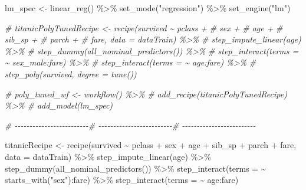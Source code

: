 \documentclass[
]{article}
\newenvironment{Shaded}{\begin{snugshade}}{\end{snugshade}}
\newcommand{\AttributeTok}[1]{\textcolor[rgb]{0.77,0.63,0.00}{#1}}
\newcommand{\CommentTok}[1]{\textcolor[rgb]{0.56,0.35,0.01}{\textit{#1}}}
\newcommand{\FunctionTok}[1]{\textcolor[rgb]{0.00,0.00,0.00}{#1}}
\newcommand{\NormalTok}[1]{#1}
\newcommand{\OtherTok}[1]{\textcolor[rgb]{0.56,0.35,0.01}{#1}}
\newcommand{\SpecialCharTok}[1]{\textcolor[rgb]{0.00,0.00,0.00}{#1}}
\newcommand{\StringTok}[1]{\textcolor[rgb]{0.31,0.60,0.02}{#1}}
\begin{document}
\begin{Shaded}
\begin{Highlighting}[]
\NormalTok{lm\_spec }\OtherTok{\textless{}{-}} \FunctionTok{linear\_reg}\NormalTok{() }\SpecialCharTok{\%\textgreater{}\%}
  \FunctionTok{set\_mode}\NormalTok{(}\StringTok{"regression"}\NormalTok{) }\SpecialCharTok{\%\textgreater{}\%}
  \FunctionTok{set\_engine}\NormalTok{(}\StringTok{"lm"}\NormalTok{)}


\CommentTok{\# titanicPolyTunedRecipe \textless{}{-} recipe(survived \textasciitilde{} pclass +}
\CommentTok{\#                            sex +}
\CommentTok{\#                            age +}
\CommentTok{\#                            sib\_sp +}
\CommentTok{\#                            parch +}
\CommentTok{\#                            fare, data = dataTrain) \%\textgreater{}\%}
\CommentTok{\#     step\_impute\_linear(age) \%\textgreater{}\%}
\CommentTok{\#     step\_dummy(all\_nominal\_predictors()) \%\textgreater{}\%}
\CommentTok{\#     step\_interact(terms = \textasciitilde{} sex\_male:fare) \%\textgreater{}\%}
\CommentTok{\#     step\_interact(terms = \textasciitilde{} age:fare) \%\textgreater{}\%}
\CommentTok{\#     step\_poly(survived, degree = tune())}


\CommentTok{\# poly\_tuned\_wf \textless{}{-} workflow() \%\textgreater{}\%}
\CommentTok{\#   add\_recipe(titanicPolyTunedRecipe) \%\textgreater{}\%}
\CommentTok{\#   add\_model(lm\_spec)}



\CommentTok{\# {-}{-}{-}{-}{-}{-}{-}{-}{-}{-}{-}{-}{-}{-}{-}{-}{-}{-}{-}{-}{-}{-}{-}{-}{-}\# {-}{-}{-}{-}{-}{-}{-}{-}{-}{-}{-}{-}{-}{-}{-}{-}{-}{-}{-}{-}{-}{-}{-}{-}{-}\# {-}{-}{-}{-}{-}{-}{-}{-}{-}{-}{-}{-}{-}{-}{-}{-}{-}{-}{-}{-}{-}{-}{-}{-}{-}}


\NormalTok{titanicRecipe }\OtherTok{\textless{}{-}} \FunctionTok{recipe}\NormalTok{(survived }\SpecialCharTok{\textasciitilde{}}\NormalTok{ pclass }\SpecialCharTok{+} 
\NormalTok{                           sex }\SpecialCharTok{+} 
\NormalTok{                           age }\SpecialCharTok{+} 
\NormalTok{                           sib\_sp }\SpecialCharTok{+}  
\NormalTok{                           parch }\SpecialCharTok{+}
\NormalTok{                           fare, }\AttributeTok{data =}\NormalTok{ dataTrain) }\SpecialCharTok{\%\textgreater{}\%}
     \FunctionTok{step\_impute\_linear}\NormalTok{(age) }\SpecialCharTok{\%\textgreater{}\%}
     \FunctionTok{step\_dummy}\NormalTok{(}\FunctionTok{all\_nominal\_predictors}\NormalTok{()) }\SpecialCharTok{\%\textgreater{}\%}
     \FunctionTok{step\_interact}\NormalTok{(}\AttributeTok{terms =} \SpecialCharTok{\textasciitilde{}} \FunctionTok{starts\_with}\NormalTok{(}\StringTok{"sex"}\NormalTok{)}\SpecialCharTok{:}\NormalTok{fare) }\SpecialCharTok{\%\textgreater{}\%}
     \FunctionTok{step\_interact}\NormalTok{(}\AttributeTok{terms =} \SpecialCharTok{\textasciitilde{}}\NormalTok{ age}\SpecialCharTok{:}\NormalTok{fare)}



\end{Highlighting}
\end{Shaded}
\end{document}
